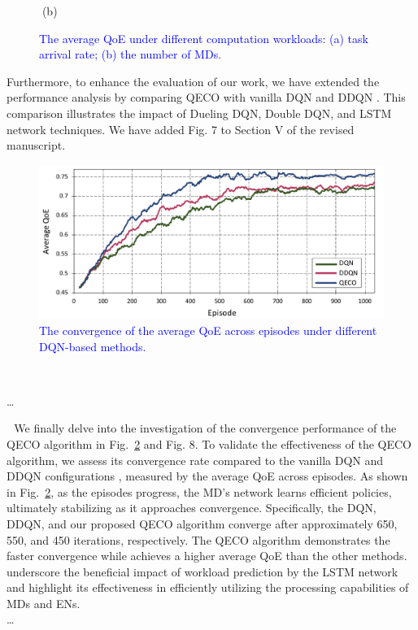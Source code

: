 \documentclass[12pt,draftclsnofoot,onecolumn]{IEEEtran}
\newcommand{\rev}[1]{{\color{blue}#1}} %
\newcommand{\rev}[1]{#1}
\newenvironment{my}[2]%
{\begin{list}{}%
{\setlength{\rightmargin}{#1}\setlength{\leftmargin}{#2}}%


 \item[]{}

} {\end{list}}
\begin{document}
\begin{enumerate}
\begin{figure}[H]
\begin{minipage}[b]{0.33\linewidth}
		\textcolor{white}{i}\hspace{0.6cm}(b)
	\end{minipage}

	\caption{\textcolor{blue}{The average QoE under different computation workloads: (a) task arrival rate; (b) the number of MDs.}}
	\label{chart44}
\end{figure} 

Furthermore, to enhance the evaluation of our work, we have extended the performance analysis by comparing QECO with vanilla DQN and DDQN \cite{van2016deep}. This comparison illustrates the impact of Dueling DQN, Double DQN, and LSTM network techniques. We have added Fig. 7 to Section V of the revised manuscript.

\begin{figure}[H]
	\captionsetup{name=Fig.}
	\centering
	\includegraphics[width=.6\linewidth]{m1}
	\vspace*{-3mm}
	\caption{\textcolor{blue}{The convergence of the average QoE across episodes under different DQN-based methods.}}
	\vspace*{-3mm}
	\label{chart111}
\end{figure}
		\begin{my}{1cm}{1cm}
	\rev{
		{\ 
			
			\dots 


\,\,\,\,We finally delve into the investigation of the convergence performance of the QECO algorithm in Fig.~\ref{chart111} and Fig. 8. To validate the effectiveness of the QECO algorithm, we assess its convergence rate compared to the vanilla DQN and DDQN configurations \cite{van2016deep}, measured by the average QoE across episodes. As shown in Fig.~\ref{chart111}, as the episodes progress, the MD's network learns efficient policies, ultimately stabilizing as it approaches convergence. Specifically, the DQN, DDQN, and our proposed QECO algorithm converge after approximately 650, 550, and 450 iterations, respectively. The QECO algorithm demonstrates the faster convergence while achieves a higher average QoE than the other methods. underscore the beneficial impact of workload prediction by the LSTM network and highlight its effectiveness in efficiently utilizing the processing capabilities of  MDs and ENs. \\\dots }}


\end{my}
\end{enumerate}
\end{document}
